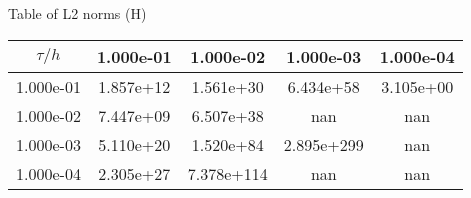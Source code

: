 \begin{center}
Table of L2 norms (H)
\\[2.0ex]  
  
\begin{tabular}{|c|c|c|c|c|} \hline
$\tau / h$ &1.000e-01 &1.000e-02 &1.000e-03 &1.000e-04 \\ \hline 
1.000e-01 &1.857e+12 &1.561e+30 &6.434e+58 &3.105e+00 \\ \hline 
1.000e-02 &7.447e+09 &6.507e+38 &nan &nan \\ \hline 
1.000e-03 &5.110e+20 &1.520e+84 &2.895e+299 &nan \\ \hline 
1.000e-04 &2.305e+27 &7.378e+114 &nan &nan \\ \hline 

\end{tabular}\\[20pt]
\end{center}
